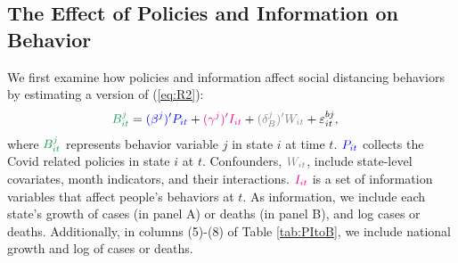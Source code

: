 \documentclass[3p, longtitle]{elsarticle}
\theoremstyle{definition}
\def\bcolor{\color{ForestGreen}}
\def\pcolor{\color{blue}}
\def\icolor{\color{magenta}}
\def\wcolor{\color{gray}}
\begin{document}
\subsection{The Effect of Policies and Information on Behavior\label{policies-and-behavior}}

We first examine how policies and information affect social distancing behaviors by estimating a version of (\ref{eq:R2}):
\begin{align}
  {\bcolor B_{it}^j}
  & = {\pcolor (\beta^j)' P_{it}} + {\icolor (\gamma^j)' I_{it}} +
    {\wcolor (\delta_B^j)' W_{it}} + \varepsilon_{it}^{bj}, \notag
\end{align}
where ${\bcolor B_{it}^j}$ represents behavior variable $j$  in state  $i$ at time $t$.
${\pcolor P_{it}}$ collects the Covid related policies  in state $i$ at $t$.
Confounders, ${\wcolor W_{it}}$, include state-level covariates, month
indicators, and their interactions.
${\icolor I_{it}}$ is a set of information variables that affect
people's behaviors at $t$. As information, we include each state's
growth of cases (in panel A) or deaths (in panel B), and log cases or deaths.  Additionally, in
columns (5)-(8) of Table \ref{tab:PItoB}, we include national growth and log
of cases or deaths.
\end{document}
